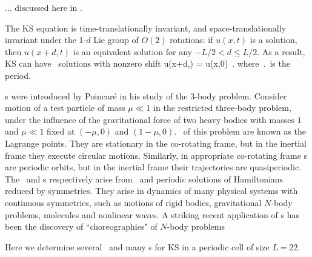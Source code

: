 \renewcommand{\inputfile}{\version\ - edited 2007-03-11 rpoHistory}


... discussed here in .

The KS equation   is time-translationally invariant,
and
space-translationally invariant
under the 1-$d$ Lie group of $O(2)$ rotations: if
$u(x,t)$ is a solution, then $u(x+d,t)$ is an equivalent
solution for any $-L/2 < d \leq L/2$.
As a result,
KS can have \rpo\ solutions with nonzero shift
\beq
u(x+d,\period{}) = u(x,0)
\,.
where $\period{}$ is the period.


{\Rpo s} were introduced by Poincar\'e in his study of
the 3-body problem.
Consider motion of a test particle of mass
$\mu \ll 1$ in the
restricted three-body problem,
under the
influence of the gravitational force of two heavy bodies with masses $1$ and
$\mu \ll 1$ fixed at $(-\mu,0)$ and $(1-\mu,0)$. \Reqva\ of this problem
are known as the Lagrange points. They are stationary in
the co-rotating frame, but
in the inertial frame they execute circular motions.
Similarly, in appropriate co-rotating frame
{\rpo s} are periodic orbits,
but in the inertial frame their trajectories
are quasiperiodic.
The \reqva\ and \rpo s
respectively arise from
\eqva\ and periodic solutions of Hamiltonians reduced by symmetries.
They arise in dynamics of many physical systems
with continuous symmetries, such as motions of rigid bodies, gravitational
$N$-body problems, molecules and nonlinear waves.
A striking recent application of \rpo s has been the discovery
of ``choreographies" of $N$-body problems%


Here we determine
several \eqva\ and many \rpo s for
KS in a periodic cell of size $L=22$.
